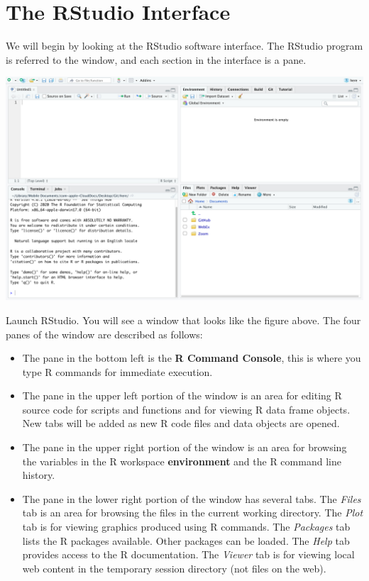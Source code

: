 \documentclass[
]{book}
\begin{document}
\hypertarget{the-rstudio-interface}{%
\section{\texorpdfstring{The \textbf{RStudio} Interface}{The RStudio Interface}}\label{the-rstudio-interface}}

We will begin by looking at the RStudio software interface. The RStudio program is referred to the window, and each section in the interface is a pane.

\includegraphics[width=49.78in]{images/rstudio}

Launch RStudio. You will see a window that looks like the figure above. The four panes of the window are described as follows:

\begin{itemize}
\item
  The pane in the bottom left is the \textbf{R Command Console}, this is where you type R commands for immediate execution.
\item
  The pane in the upper left portion of the window is an area for editing R source code for scripts and functions and for viewing R data frame objects. New tabs will be added as new R code files and data objects are opened.
\item
  The pane in the upper right portion of the window is an area for browsing the variables in the R workspace \textbf{environment} and the R command line history.
\item
  The pane in the lower right portion of the window has several tabs. The \emph{Files} tab is an area for browsing the files in the current working directory. The \emph{Plot} tab is for viewing graphics produced using R commands. The \emph{Packages} tab lists the R packages available. Other packages can be loaded. The \emph{Help} tab provides access to the R documentation. The \emph{Viewer} tab is for viewing local web content in the temporary session directory (not files on the web).
\end{itemize}
\end{document}
